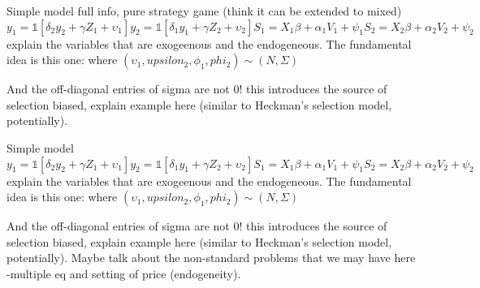 \documentclass{beamer}
\begin{document}
\begin{frame}{Simple model}
    full info, pure strategy game (think it can be extended to mixed)
    \begin{equation}
        y_1= \mathbb{1}\left[\delta_{2}y_2+\gamma Z_{1}+ \upsilon_1 \right]
        y_2= \mathbb{1}\left[\delta_{1}y_1+\gamma Z_{2}+ \upsilon_2 \right]

        S_1=X_1\beta + \alpha_1 V_1 + \psi_1
        S_2=X_2\beta + \alpha_2 V_2 + \psi_2
    \end{equation}
    explain the variables that are exogeenous and the endogeneous. The fundamental idea is this one:
    where \(\left(\upsilon_1, upsilon_2, \phi_1, phi_2\right) \sim (N,\Sigma)\)
     
    And the off-diagonal entries of sigma are not 0! this introduces the source of selection biased, explain example here (similar to Heckman's selection model, potentially). 
\end{frame}



\begin{frame}{Simple model}
    \begin{equation}
        y_1= \mathbb{1}\left[\delta_{2}y_2+\gamma Z_{1}+ \upsilon_1 \right]
        y_2= \mathbb{1}\left[\delta_{1}y_1+\gamma Z_{2}+ \upsilon_2 \right]

        S_1=X_1\beta + \alpha_1 V_1 + \psi_1
        S_2=X_2\beta + \alpha_2 V_2 + \psi_2
    \end{equation}
    explain the variables that are exogeenous and the endogeneous. The fundamental idea is this one:
    where \(\left(\upsilon_1, upsilon_2, \phi_1, phi_2\right) \sim (N,\Sigma)\)
     
    And the off-diagonal entries of sigma are not 0! this introduces the source of selection biased, explain example here (similar to Heckman's selection model, potentially). Maybe talk about the non-standard problems that we may have here -multiple eq and setting of price (endogeneity).  
\end{frame}
\end{document}
